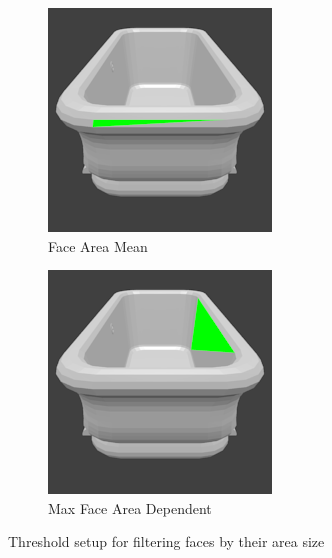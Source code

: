 \begin{figure}
\begin{subfigure}{.32\textwidth}
		\includegraphics[width=\textwidth]{images/face_area_mean.png}
		\caption{Face Area Mean}
		\label{fig:face-area-mean}
	\end{subfigure}
	\begin{subfigure}{.32\textwidth}
		\centering
		\includegraphics[width=\textwidth]{images/face_area_max_dependent.png}
		\caption{Max Face Area Dependent}
		\label{fig:face-area-max-dependent}
	\end{subfigure}
	\caption{Threshold setup for filtering faces by their area size}
	\label{fig:face-area-filter}
\end{figure}
